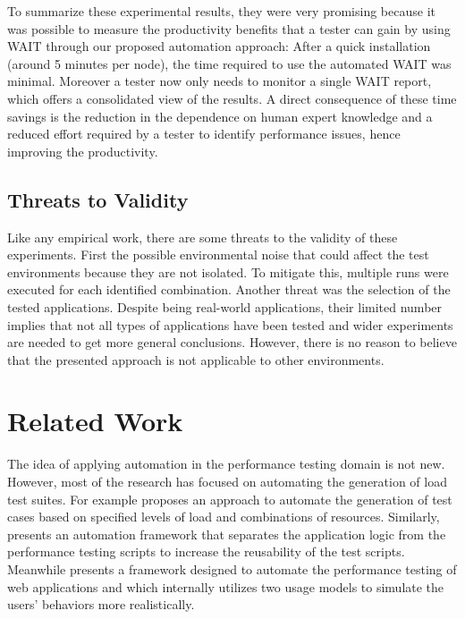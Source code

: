 \documentclass[runningheads,a4paper]{llncs}
\begin{document}
To summarize these experimental results, they were very promising because it
was possible to measure the productivity benefits that a tester can gain by using
WAIT through our proposed automation approach: After a quick installation
(around 5 minutes per node), the time required to use the automated WAIT was
minimal. Moreover a tester now only needs to monitor a single WAIT report, which
offers a consolidated view of the results. A direct consequence of these
time savings is the reduction in the dependence on human expert knowledge and
a reduced effort required by a tester to identify performance issues, hence
improving the productivity.

\vspace{-7pt}
\subsection{Threats to Validity}
\vspace{-7pt}
Like any empirical work, there are some threats to the validity of these
experiments. First the possible environmental noise that could affect the test
environments because they are not isolated. To mitigate this, multiple runs were
executed for each identified combination. Another threat was the selection of
the tested applications. Despite being real-world applications, their limited
number implies that not all types of applications have been tested and wider
experiments are needed to get more general conclusions. However, there is no
reason to believe that the presented approach is not applicable to other
environments.



\vspace{-7pt}
\section{Related Work}
\label{RelatedWork}
\vspace{-7pt}
The idea of applying automation in the performance testing domain is not new.
However, most of the research has focused on automating the generation of load
test
suites\cite{Elvira1,Bayan1,Zhang1,Briand1,Chen1,Garousi1,Xingen1}.
For example \cite{Bayan1} proposes an approach to automate the generation of test 
cases based on specified levels of load and combinations of resources.
Similarly, \cite{Chen1} presents an automation framework that separates the
application logic from the performance testing scripts to increase the
reusability of the test scripts. Meanwhile \cite{Xingen1} presents a framework
designed to automate the performance testing of web applications
and which internally utilizes two usage models to simulate the users’ behaviors
more realistically.
\end{document}
